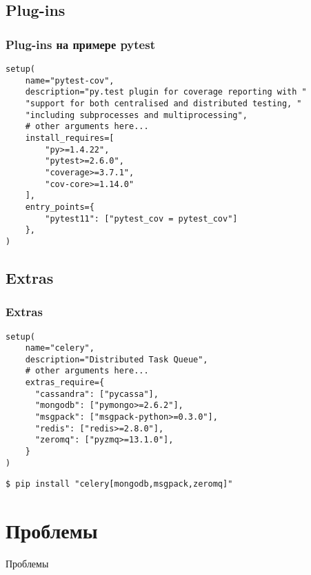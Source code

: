 \documentclass[10pt,pdf,utf8,russian,aspectratio=169,xcolor=dvipsnames,x11names,center]{beamer}
\begin{document}
\subsection{Plug-ins}

\begin{frame}[fragile]
  \frametitle{Plug-ins на примере pytest}

  \begin{lstlisting}[caption=setup.py pytest-плагина pytest-cov]
setup(
    name="pytest-cov",
    description="py.test plugin for coverage reporting with "
    "support for both centralised and distributed testing, "
    "including subprocesses and multiprocessing",
    # other arguments here...
    install_requires=[
        "py>=1.4.22",
        "pytest>=2.6.0",
        "coverage>=3.7.1",
        "cov-core>=1.14.0"
    ],
    entry_points={
        "pytest11": ["pytest_cov = pytest_cov"]
    },
)
  \end{lstlisting}
\end{frame}

\subsection{Extras}

\begin{frame}[fragile]
  \frametitle{Extras}

  \begin{lstlisting}
setup(
    name="celery",
    description="Distributed Task Queue",
    # other arguments here...
    extras_require={
      "cassandra": ["pycassa"],
      "mongodb": ["pymongo>=2.6.2"],
      "msgpack": ["msgpack-python>=0.3.0"],
      "redis": ["redis>=2.8.0"],
      "zeromq": ["pyzmq>=13.1.0"],
    }
)
  \end{lstlisting}
  \pause
  \vspace{0.5cm}
  \begin{lstlisting}[numbers=none]
$ pip install "celery[mongodb,msgpack,zeromq]"
  \end{lstlisting}
\end{frame}

\section{Проблемы}

\begin{frame}
  \begin{center}
    {\Huge Проблемы}
  \end{center}
\end{frame}
\end{document}
